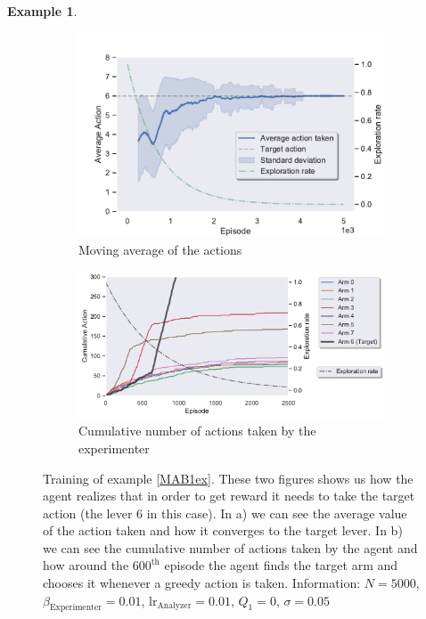 \documentclass[11pt,a4paper,twoside]{report}
\newcommand{\+}{\textnormal{+} }
\theoremstyle{definition}
\newtheorem{myex}[mythm]{Example}
\numberwithin{equation}{chapter}
\begin{document}
\begin{myex}
    \begin{figure}[]
      \centering
      \begin{subfigure}{.5\textwidth}
        \centering
        \includegraphics[width=1\linewidth]{figures/Actions-MAB1.pdf}
        \caption{Moving average of the actions}
        \label{fig:ActionAverageMAB1}
      \end{subfigure}%
      \begin{subfigure}{.5\textwidth}
        \centering
        \includegraphics[width=1\linewidth]{figures/Cum-action-MAB1.pdf}
        \caption{Cumulative number of actions taken by the experimenter}
        \label{fig:actionsMAB1}
      \end{subfigure}
      \caption{Training of example \ref{MAB1ex}. These two figures shows us how
      the agent realizes that in order to get reward it needs to take the target
      action (the lever 6 in this case). In a) we can see the average value of
      the action taken and how it converges to the target lever. In b) we can
      see the cumulative number of actions taken by the agent and how around the
      $600^\text{th}$ episode the agent finds the target arm and chooses it
      whenever a greedy action is taken. Information: $N=5000$,
      $\beta_\text{Experimenter}=0.01$, $\text{lr}_\text{Analyzer}=0.01$,
      $Q_1=0$, $\sigma=0.05$}
    \end{figure}  




\end{myex}
\end{document}
